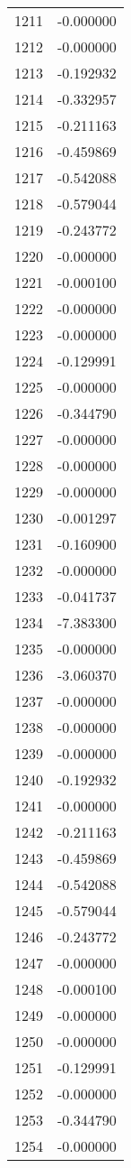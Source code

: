 \documentclass[12pt]{article}
\begin{document}
\begin{longtable}{@{}cc@{}}
1211 & -0.000000 \\
1212 & -0.000000 \\
1213 & -0.192932 \\
1214 & -0.332957 \\
1215 & -0.211163 \\
1216 & -0.459869 \\
1217 & -0.542088 \\
1218 & -0.579044 \\
1219 & -0.243772 \\
1220 & -0.000000 \\
1221 & -0.000100 \\
1222 & -0.000000 \\
1223 & -0.000000 \\
1224 & -0.129991 \\
1225 & -0.000000 \\
1226 & -0.344790 \\
1227 & -0.000000 \\
1228 & -0.000000 \\
1229 & -0.000000 \\
1230 & -0.001297 \\
1231 & -0.160900 \\
1232 & -0.000000 \\
1233 & -0.041737 \\
1234 & -7.383300 \\
1235 & -0.000000 \\
1236 & -3.060370 \\
1237 & -0.000000 \\
1238 & -0.000000 \\
1239 & -0.000000 \\
1240 & -0.192932 \\
1241 & -0.000000 \\
1242 & -0.211163 \\
1243 & -0.459869 \\
1244 & -0.542088 \\
1245 & -0.579044 \\
1246 & -0.243772 \\
1247 & -0.000000 \\
1248 & -0.000100 \\
1249 & -0.000000 \\
1250 & -0.000000 \\
1251 & -0.129991 \\
1252 & -0.000000 \\
1253 & -0.344790 \\
1254 & -0.000000 \\

\end{longtable}
\end{document}
